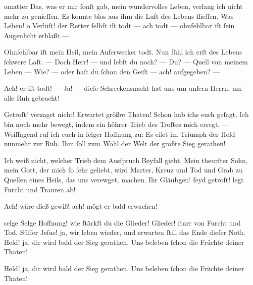 \documentclass{ees}
\begin{document}
{\begin{movement}{omatter}
    \voice[Eidli]
    Das, was er mir ſonſt gab, mein wundervolles Leben,
    verlang ich nicht mehr zu genieſſen.
    Es konnte blos aus ihm die Luft des Lebens flieſſen.
    Was Leben! o Verluſt! der Retter ſelbſt iſt todt —
    ach todt — ohnfehlbar iſt ſein Augenlicht erblaßt —

    \voice[Lazarus]
    Ohnfehlbar iſt mein Heil, mein Auferwecker todt.
    Nun fühl ich erſt des Lebens ſchwere Laſt. —
    Doch Herr! — und lebſt du noch? — Du? — Quell von meinem Leben —
    Wie? — oder haſt du ſchon den Geiſt — ach! aufgegeben? —

    Ach! er iſt todt! — Ja! — dieſe Schreckensnacht
    hat uns um unſern Herrn, um alle Ruh gebracht!

    \voice[Johannes]
    Getroſt! verzaget nicht! Erwartet größre Thaten!
    Schon hab ichs euch geſagt. Ich bin noch mehr bewegt,
    indem ein höhrer Trieb des Troſtes mich erregt. —
    Weiſſagend ruf ich euch in ſelger Hoffnung zu:
    Es eilet im Triumph der Held nunmehr zur Ruh.
    Ihm ſoll zum Wohl der Welt der größte Sieg gerathen!

    \voice[Maria]
    Ich weiß nicht, welcher Trieb dem Ausſpruch Beyfall giebt.
    Mein theurſter Sohn, mein Gott, der mich ſo ſehr geliebt,
    wird Marter, Kreuz und Tod und Grab
    zu Quellen eines Heils, das uns verewget, machen.
    Ihr Gläubgen! ſeyd getroſt! legt Furcht und Trauren ab!

    Ach! wäre dieß gewiß! ach! mögt er bald erwachen!
  \end{movement}

  \begin{movement}{selge}
    \voice[Maria]
    Selge Hoffnung! wie ſtärkſt du die Glieder!
    Glieder! ſtarr von Furcht und Tod.
    Süſſer Jeſus! ja, wir leben wieder,
    und erwarten ſtill das Ende dieſer Noth.
    Held! ja, dir wird bald der Sieg gerathen.
    Uns beleben ſchon die Früchte deiner Thaten!

    Held! ja, dir wird bald der Sieg gerathen.
    Uns beleben ſchon die Früchte deiner Thaten!
  \end{movement}

}
\end{document}
